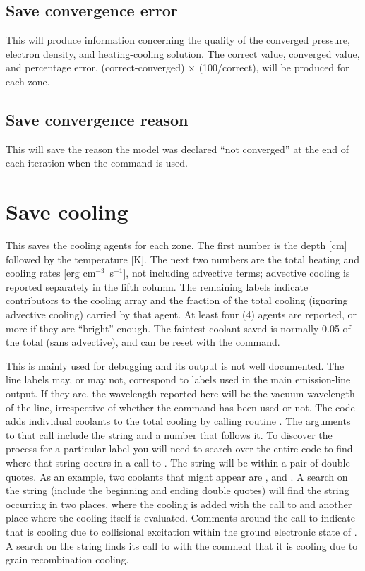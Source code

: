 \subsection{Save convergence error}

This will produce information concerning the quality of the converged
pressure, electron density, and heating-cooling solution.  The correct value,
converged value, and percentage error, (correct-converged) $\times$ (100/correct), will be produced for each zone.

\subsection{Save convergence reason}

This will save the reason the model was declared ``not converged'' at
the end of each iteration when the
 command is used.

\section{Save cooling}

This saves the cooling agents for each zone.  The first number is the
depth [cm] followed by the temperature [K].  The next two numbers are the
total heating and cooling rates [erg cm$^{-3}$~s$^{-1}$], not including
advective terms; advective cooling is reported separately in the fifth column.
The remaining labels indicate contributors to the cooling array and the
fraction of the total cooling (ignoring advective cooling) carried by that agent.
At least four (4) agents are reported, or more if they are ``bright'' enough.
The faintest coolant saved is normally 0.05 of the total (sans advective),
and can be reset with the  command.

This is mainly used for debugging and its output is not well documented.
The line labels may, or may not, correspond to labels used in the main
emission-line output. If they are, the wavelength reported here will be
the vacuum wavelength of the line, irrespective of whether the
 command has been used or not.
The code adds individual coolants to the total cooling
by calling routine .
The arguments to that call include the string
and a number that follows it.   To discover the process for a particular
label you will need to search over the entire code to find where that string
occurs in a call to .
The string will be within a pair of double
quotes.
As an example, two coolants that might appear are
, and .  A search on the string  (include the beginning and ending double
quotes) will find the string occurring in two places, where the cooling
is added with the call to  and another place where the cooling itself
is evaluated.  Comments around the call to 
indicate that  is
cooling due to collisional excitation within the ground electronic state
of \htwo.   A search on the string  finds its call to
 with
the comment that it is cooling due to grain recombination cooling.

